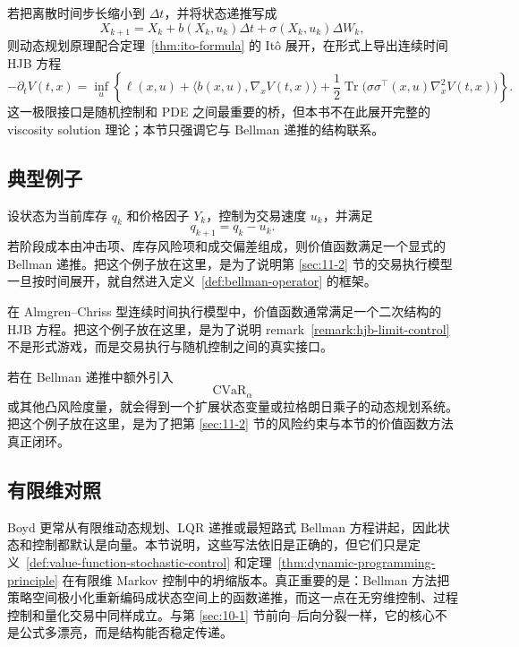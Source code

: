 \begin{remark}\label{remark:hjb-limit-control}
若把离散时间步长缩小到 $\Delta t$，并将状态递推写成
\[
X_{k+1}=X_k+b(X_k,u_k)\Delta t+\sigma(X_k,u_k)\Delta W_k,
\]
则动态规划原理配合定理~\ref{thm:ito-formula} 的 It\^o 展开，在形式上导出连续时间 HJB 方程
\[
-\partial_t V(t,x)
=
\inf_u
\left\{
\ell(x,u)+\langle b(x,u),\nabla_x V(t,x)\rangle
+
\frac12\operatorname{Tr}\bigl(\sigma\sigma^\top(x,u)\nabla_x^2V(t,x)\bigr)
\right\}.
\]
这一极限接口是随机控制和 PDE 之间最重要的桥，但本书不在此展开完整的 viscosity solution 理论；本节只强调它与 Bellman 递推的结构联系。
\end{remark}

\subsection{典型例子}

\begin{example}
设状态为当前库存 $q_k$ 和价格因子 $Y_k$，控制为交易速度 $u_k$，并满足
\[
q_{k+1}=q_k-u_k.
\]
若阶段成本由冲击项、库存风险项和成交偏差组成，则价值函数满足一个显式的 Bellman 递推。把这个例子放在这里，是为了说明第 \ref{sec:11-2} 节的交易执行模型一旦按时间展开，就自然进入定义~\ref{def:bellman-operator} 的框架。
\end{example}

\begin{example}
在 Almgren--Chriss 型连续时间执行模型中，价值函数通常满足一个二次结构的 HJB 方程。把这个例子放在这里，是为了说明 remark~\ref{remark:hjb-limit-control} 不是形式游戏，而是交易执行与随机控制之间的真实接口。
\end{example}

\begin{example}[受风险约束的随机控制]
若在 Bellman 递推中额外引入
\[
\operatorname{CVaR}_\alpha
\]
或其他凸风险度量，就会得到一个扩展状态变量或拉格朗日乘子的动态规划系统。把这个例子放在这里，是为了把第 \ref{sec:11-2} 节的风险约束与本节的价值函数方法真正闭环。
\end{example}

\subsection*{有限维对照}

Boyd 更常从有限维动态规划、LQR 递推或最短路式 Bellman 方程讲起，因此状态和控制都默认是向量。本节说明，这些写法依旧是正确的，但它们只是定义~\ref{def:value-function-stochastic-control} 和定理~\ref{thm:dynamic-programming-principle} 在有限维 Markov 控制中的坍缩版本。真正重要的是：Bellman 方法把策略空间极小化重新编码成状态空间上的函数递推，而这一点在无穷维控制、过程控制和量化交易中同样成立。与第 \ref{sec:10-1} 节前向--后向分裂一样，它的核心不是公式多漂亮，而是结构能否稳定传递。

